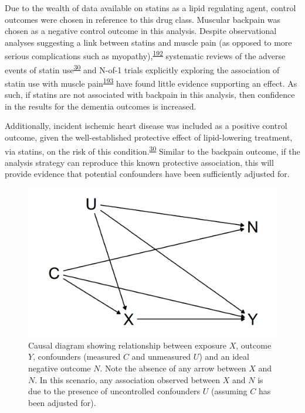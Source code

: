 \documentclass[a4paper, twoside]{templates/ociamthesis}
\begin{document}
Due to the wealth of data available on statins as a lipid regulating agent, control outcomes were chosen in reference to this drug class. Muscular backpain was chosen as a negative control outcome in this analysis. Despite observational analyses suggesting a link between statins and muscle pain (as opposed to more serious complications such as myopathy),\textsuperscript{\protect\hyperlink{ref-selva-ocallaghan2018}{192}} systematic reviews of the adverse events of statin use\textsuperscript{\protect\hyperlink{ref-collins2016a}{30}} and N-of-1 trials explicitly exploring the association of statin use with muscle pain\textsuperscript{\protect\hyperlink{ref-herrett2021}{193}} have found little evidence supporting an effect. As such, if statins are not associated with backpain in this analysis, then confidence in the results for the dementia outcomes is increased.

Additionally, incident ischemic heart disease was included as a positive control outcome, given the well-established protective effect of lipid-lowering treatment, via statins, on the risk of this condition.\textsuperscript{\protect\hyperlink{ref-collins2016a}{30}} Similar to the backpain outcome, if the analysis strategy can reproduce this known protective association, this will provide evidence that potential confounders have been sufficiently adjusted for.





\begin{figure}[H]
\includegraphics[width=1\linewidth]{figures/cprd-analysis/negativeOutcome} \caption[DAG of ideal negative outcome]{Causal diagram showing relationship between exposure \(X\), outcome \(Y\), confounders (measured \(C\) and unmeasured \(U\)) and an ideal negative outcome \(N\). Note the absence of any arrow between \(X\) and \(N\). In this scenario, any association observed between \(X\) and \(N\) is due to the presence of uncontrolled confounders \(U\) (assuming \(C\) has been adjusted for).}\label{fig:negativeOutcome}
\end{figure}
\end{document}
